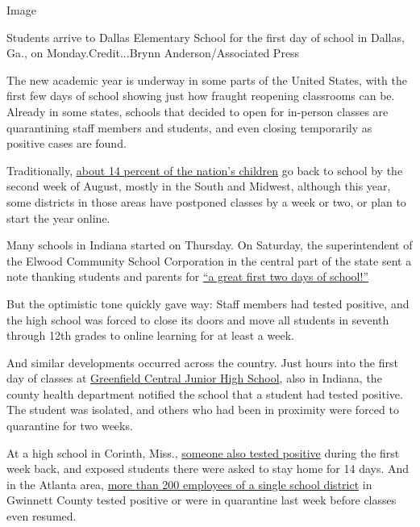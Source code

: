 Image

Students arrive to Dallas Elementary School for the first day of school
in Dallas, Ga., on Monday.Credit...Brynn Anderson/Associated Press

The new academic year is underway in some parts of the United States,
with the first few days of school showing just how fraught reopening
classrooms can be. Already in some states, schools that decided to open
for in-person classes are quarantining staff members and students, and
even closing temporarily as positive cases are found.

Traditionally,
\href{https://www.pewresearch.org/fact-tank/2019/08/14/back-to-school-dates-u-s/}{about
14 percent of the nation's children} go back to school by the second
week of August, mostly in the South and Midwest, although this year,
some districts in those areas have postponed classes by a week or two,
or plan to start the year online.

Many schools in Indiana started on Thursday. On Saturday, the
superintendent of the Elwood Community School Corporation in the central
part of the state sent a note thanking students and parents for
\href{https://www.facebook.com/ElwoodCommunitySchools/photos/pcb.1875944365880857/1875944205880873/?type=3\&theater}{``a
great first two days of school!''}

But the optimistic tone quickly gave way: Staff members had tested
positive, and the high school was forced to close its doors and move all
students in seventh through 12th grades to online learning for at least
a week.

And similar developments occurred across the country. Just hours into
the first day of classes at
\href{https://www.nytimes.com/2020/08/01/us/schools-reopening-indiana-coronavirus.html}{Greenfield
Central Junior High School}, also in Indiana, the county health
department notified the school that a student had tested positive. The
student was isolated, and others who had been in proximity were forced
to quarantine for two weeks.

At a high school in Corinth, Miss.,
\href{https://www.facebook.com/corinthschooldistrict/?tn-str=k*F}{someone
also tested positive} during the first week back, and exposed students
there were asked to stay home for 14 days. And in the Atlanta area,
\href{https://www.ajc.com/news/atlanta-news/covid-cases-exposure-have-260-gwinnett-school-employees-not-working/RVZP4UFBPFHDNJJ73MNUFIKEPY/}{more
than 200 employees of a single school district} in Gwinnett County
tested positive or were in quarantine last week before classes even
resumed.

